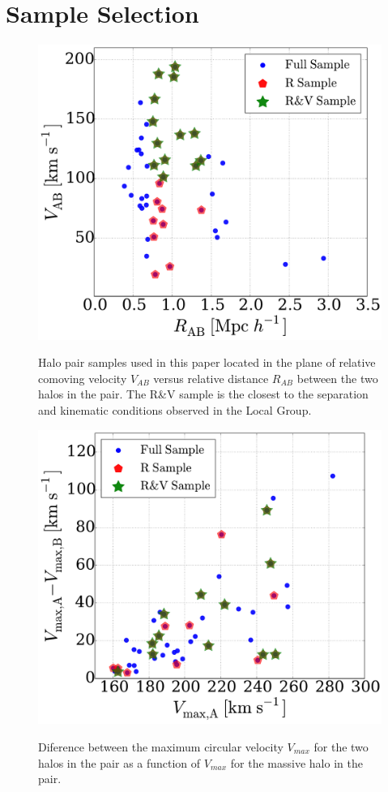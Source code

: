 \documentclass{emulateapj}
\begin{document}
\section{Sample Selection}

\begin{figure}
\centering
\includegraphics[width=\hsize]{v_r_pairs.pdf}\\
\caption{Halo pair samples used in this paper located in the
  plane of relative comoving velocity $V_{AB}$ versus relative
  distance $R_{AB}$ between the two halos in the pair.
  The R\&V sample is the closest to the separation and kinematic
  conditions observed in the Local Group.} 
\label{fig:samples}
\end{figure}

\begin{figure}
\centering
\includegraphics[width=\hsize]{v_circ_pairs.pdf}\\
\caption{Diference between the maximum circular velocity $V_{max}$ for the two
  halos in the pair as a function of $V_{max}$ for the massive halo in
  the pair.}
\label{fig:vcirc}
\end{figure}
\end{document}
